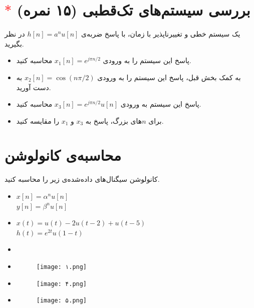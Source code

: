 \documentclass[a4paper]{article}
\begin{document}
	\section{
		\textcolor{red}{$\ast$}
		بررسی سیستم‌های تک‌قطبی (۱۵ نمره)
	}
	یک سیستم خطی و تغییرناپذیر با زمان، با پاسخ ضربه‌ی 
	$h[n] = a^n u[n]$
	در نظر بگیرید.
	\begin{itemize}
		\item 
		پاسخ این سیستم را به ورودی 
		$x_1[n] = e^{j\pi n/2}$
		محاسبه کنید.
		\item 
		به کمک  بخش قبل، پاسخ این سیستم را به ورودی 
		$x_2[n] = \cos(n\pi/2)$
		به دست آورید.
		\item 
		پاسخ این سیستم به ورودی 
		$x_3[n] =e^{j\pi n/2} u[n] $
		محاسبه کنید.
		\item
		برای $n$های بزرگ، پاسخ به $x_3$ و $ x_1$
		را مقایسه کنید.
	\end{itemize}
	
	\section{
		محاسبه‌ی کانولوشن
	}
	کانولوشن سیگنال‌های داده‌‌شده‌ی زیر را محاسبه کنید.
	\begin{latin}
		\begin{itemize}
			
			\item 
			
			$x[n] = \alpha^n u[n]$\\
			$y[n] = \beta^n u[n]$
			\item
			$x(t) = u(t) - 2u(t-2) + u(t-5)$\\
			$h(t) = e^{2t}u(1-t)$
			\item
			\item
			\begin{figure}[h]
				\centering
				\texttt{[image: ۱.png]}
			\end{figure}
			
			\item
			\begin{figure}[h]
				\centering
				\texttt{[image: ۴.png]}
			\end{figure}
			\item
			\begin{figure}[h]
				\centering
				\texttt{[image: ۵.png]}
			\end{figure}
		\end{itemize}
	\end{latin}
	
	
\end{document}
